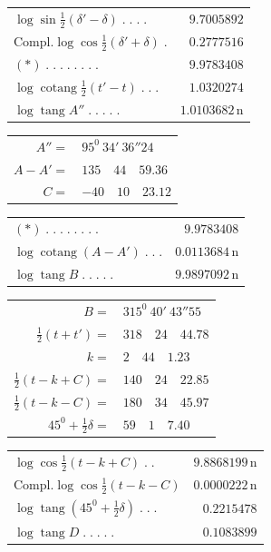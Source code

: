%
\begin{center}\small
\begin{tabular}{lr}
$\log\sin\tfrac12(\delta'-\delta)\;.\;.\;.\;.$&$9.7005892$\\
$\mathrm{Compl.}\log\cos\tfrac12(\delta'+\delta)\;.$&$0.2777516$\\\hline
$(*)\;.\;.\;.\;.\;.\;.\;.\;.$&$9.9783408$\\
$\log\operatorname{cotang}\tfrac12(t'-t)\;.\;.\;.$&$1.0320274$\\\hline
$\log\operatorname{tang}A''\;.\;.\;.\;.\;.$&$1.0103682\,\mathrm n$
\end{tabular}
\par\smallskip
\begin{tabular}{rl}
$A''=$&$95^0\ 34'\ 36''24$\\
$A-A'=$&$135\quad44\quad59.36$\\
$C=$&$-40\quad10\quad23.12$
\end{tabular}
\par\medskip
\begin{tabular}{lr}
$(*)\;.\;.\;.\;.\;.\;.\;.\;.$&$9.9783408$\\
$\log\operatorname{cotang}(A-A')\;.\;.\;.$&$0.0113684\,\mathrm n$\\\hline
$\log\operatorname{tang}B\;.\;.\;.\;.\;.$&$9.9897092\,\mathrm n$
\end{tabular}
\par\smallskip
\begin{tabular}{rl}
$B=$&$315^0\ 40'\ 43''55$\\
$\tfrac12(t+t')=$&$318\quad24\quad44.78$\\\hline
$k=$&$2\quad44\quad1.23$\\[4pt]
$\tfrac12(t-k+C)=$&$140\quad24\quad22.85$\\
$\tfrac12(t-k-C)=$&$180\quad34\quad45.97$\\
$45^0+\tfrac12\delta=$&$59\quad1\quad7.40$
\end{tabular}
\par\medskip
\begin{tabular}{lr}
$\log\cos\tfrac12(t-k+C)\;.\;.$&$9.8868199\,\mathrm n$\\
$\mathrm{Compl.}\log\cos\tfrac12(t-k-C)$&$0.0000222\,\mathrm n$\\
$\log\operatorname{tang}(45^0+\tfrac12\delta)\;.\;.\;.$&$0.2215478$\\\hline
$\log\operatorname{tang}D\;.\;.\;.\;.\;.$&$0.1083899$
\end{tabular}
\par\smallskip

\end{center}
